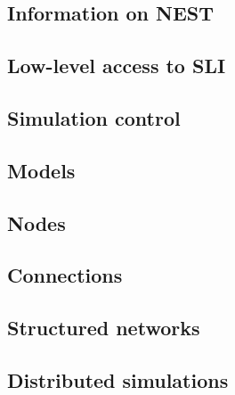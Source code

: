 \documentclass[a4paper,10pt]{report}
\begin{document}
\subsection{Information on NEST}
\subsection{Low-level access to SLI}
\subsection{Simulation control}
\subsection{Models}
\subsection{Nodes}
\subsection{Connections}
\subsection{Structured networks}
\subsection{Distributed simulations}




\printindex  
\end{document}
